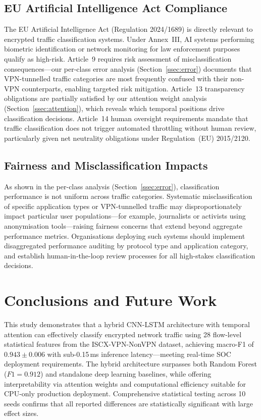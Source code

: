 \documentclass[conference]{IEEEtran}
\begin{document}
\subsection{EU Artificial Intelligence Act Compliance}
\label{ssec:euaiact}

The EU Artificial Intelligence Act (Regulation 2024/1689) \cite{euaiact2024}
is directly relevant to encrypted traffic classification systems. Under
Annex~III, AI systems performing biometric identification or network monitoring
for law enforcement purposes qualify as high-risk. Article~9 requires risk
assessment of misclassification consequences---our per-class error analysis
(Section~\ref{ssec:error}) documents that VPN-tunnelled traffic categories are most
frequently confused with their non-VPN counterparts, enabling targeted risk mitigation. Article~13 transparency
obligations are partially satisfied by our attention weight analysis
(Section~\ref{ssec:attention}), which reveals which temporal positions drive
classification decisions. Article~14 human oversight requirements mandate that
traffic classification does not trigger automated throttling without human
review, particularly given net neutrality obligations under Regulation~(EU)
2015/2120.

\subsection{Fairness and Misclassification Impacts}

As shown in the per-class analysis (Section~\ref{ssec:error}), classification
performance is not uniform across traffic categories. Systematic
misclassification of specific application types or VPN-tunnelled traffic may
disproportionately impact particular user populations---for example,
journalists or activists using anonymisation tools---raising fairness concerns
that extend beyond aggregate performance metrics. Organisations deploying such
systems should implement disaggregated performance auditing by protocol type
and application category, and establish human-in-the-loop review processes for
all high-stakes classification decisions.

\section{Conclusions and Future Work}
\label{sec:conclusions}

This study demonstrates that a hybrid CNN-LSTM architecture with temporal
attention can effectively classify encrypted network traffic using 28 flow-level
statistical features from the ISCX-VPN-NonVPN dataset, achieving macro-F1 of
$0.943 \pm 0.006$ with sub-0.15\,ms inference latency---meeting real-time SOC
deployment requirements. The hybrid architecture surpasses both Random Forest
($F1 = 0.912$) and standalone deep learning baselines, while offering
interpretability via attention weights and computational efficiency suitable for
CPU-only production deployment. Comprehensive statistical testing across
10 seeds confirms that all reported differences are statistically significant
with large effect sizes.
\end{document}
